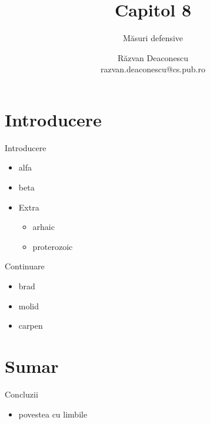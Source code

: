 \documentclass{training}
\title[Capitol 8]{Capitol 8}
\subtitle{Măsuri defensive}
\author[Răzvan]{Răzvan Deaconescu\\razvan.deaconescu@cs.pub.ro}
\date{}
\begin{document}
\frame{\titlepage}

\frame{\tableofcontents}

\section{Introducere}

\begin{frame}{Introducere}
  \begin{itemize}
    \item alfa
    \item beta
    \item Extra
      \begin{itemize}
        \item arhaic
        \item proterozoic
      \end{itemize}
  \end{itemize}
\end{frame}

\begin{frame}{Continuare}
  \begin{itemize}
    \item brad
    \item molid
    \item carpen
  \end{itemize}
\end{frame}

\frame{\tableofcontents}

\section{Sumar}

\begin{frame}{Concluzii}
  \begin{itemize}
    \item povestea cu limbile
  \end{itemize}
\end{frame}
\end{document}
